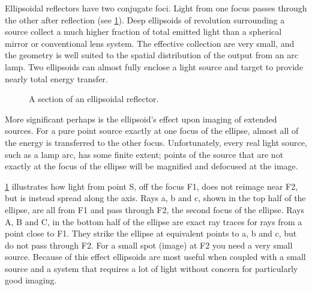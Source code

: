 Ellipsoidal reflectors have two conjugate foci. Light from one focus passes through the other after reflection (see \ref{Fig:EllipsoidalReflectors}).
Deep ellipsoids of revolution surrounding a source collect a much higher fraction of total emitted light than a spherical mirror or conventional lens system.
The effective collection are very small, and the geometry is well suited to the spatial distribution of the output from an arc lamp.
Two ellipsoids can almost fully enclose a light source and target to provide nearly total energy transfer.
    \begin{figure}[!htp]
        \centering{}
        \caption{A section of an ellipsoidal reflector. }
        \label{Fig:EllipsoidalReflectors}
    \end{figure}
More significant perhaps is the ellipsoid's effect upon imaging of extended sources.
For a pure point source exactly at one focus of the ellipse, almost all of the energy is transferred to the other focus.
Unfortunately, every real light source, such as a lamp arc, has some finite extent; points of the source that are not exactly at the focus of the ellipse will be magnified and defocused at the image.

\ref{Fig:EllipsoidalReflectors} illustrates how light from point S, off the focus F1, does not reimage near F2, but is instead spread along the axis.
Rays a, b and c, shown in the top half of the ellipse, are all from F1 and pass through F2, the second focus of the ellipse. Rays A, B and C, in the bottom half of the ellipse are exact ray traces for rays from a point close to F1. They strike the ellipse at equivalent points to a, b and c, but do not pass through F2. For a small spot (image) at F2 you need a very small source.
Because of this effect ellipsoids are most useful when coupled with a small source and a system that requires a lot of light without concern for particularly good imaging.



